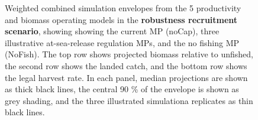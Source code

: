 \documentclass[11pt]{book}
\begin{document}
\begin{landscape}
\begin{figure}[htb]
{\centering {} 

}

\caption{Weighted combined simulation envelopes from the 5 productivity and biomass operating models in the \textbf{robustness recruitment scenario}, showing showing the current MP (noCap), three illustrative at-sea-release regulation MPs, and the no fishing MP (NoFish). The top row shows projected biomass relative to unfished, the second row shows the landed catch, and the bottom row shows the legal harvest rate. In each panel, median projections are shown as thick black lines, the central 90 \% of the envelope is shown as grey shading, and the three illustrated simulationa replicates as thin black lines.}\label{fig:unnamed-chunk-24}
\end{figure}
\end{landscape}
\MakeAvailable
\end{document}
